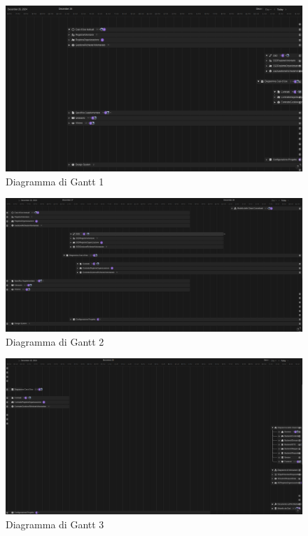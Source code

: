 \documentclass[12pt]{article}
\begin{document}
\begin{figure}[H]
    \includegraphics[width=\textwidth,keepaspectratio]{Immagini/Gantt/Iterazione 1/Gantt1.png}
        \caption{Diagramma di Gantt 1} 
        \label{fig:Gantt1}
\end{figure}

\begin{figure}[H]
    \includegraphics[width=\textwidth,keepaspectratio]{Immagini/Gantt/Iterazione 1/Gantt2.png}
        \caption{Diagramma di Gantt 2} 
        \label{fig:Gantt2}
\end{figure}

\begin{figure}[H]
    \includegraphics[width=\textwidth,keepaspectratio]{Immagini/Gantt/Iterazione 1/Gantt3.png}
        \caption{Diagramma di Gantt 3} 
        \label{fig:Gantt3}
\end{figure}
\end{document}
